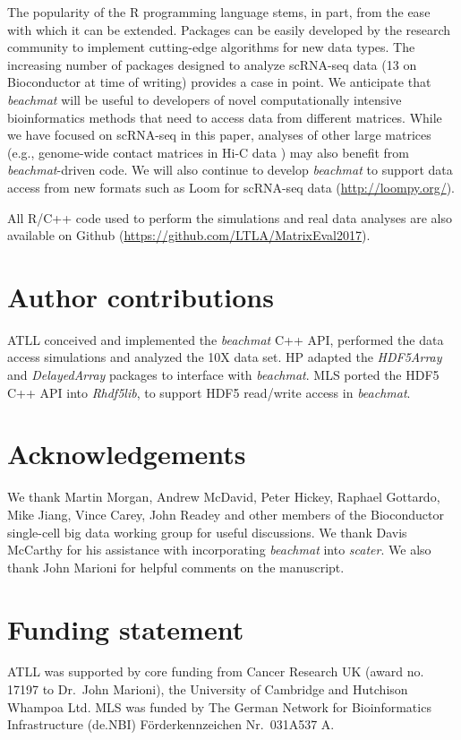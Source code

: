 \documentclass[10pt,letterpaper]{article}
\newcommand{\beachmat}{\textit{beachmat}}
\begin{document}
The popularity of the R programming language stems, in part, from the ease with which it can be extended.
Packages can be easily developed by the research community to implement cutting-edge algorithms for new data types.
The increasing number of packages designed to analyze scRNA-seq data (13 on Bioconductor at time of writing) provides a case in point.
We anticipate that \beachmat{} will be useful to developers of novel computationally intensive bioinformatics methods that need to access data from different matrices.
While we have focused on scRNA-seq in this paper, analyses of other large matrices (e.g., genome-wide contact matrices in Hi-C data \cite{lun2016infrastructure}) may also benefit from \beachmat{}-driven code.
We will also continue to develop \beachmat{} to support data access from new formats such as Loom for scRNA-seq data (\url{http://loompy.org/}).

All R/C++ code used to perform the simulations and real data analyses are also available on Github (\url{https://github.com/LTLA/MatrixEval2017}).

\section*{Author contributions}
ATLL conceived and implemented the \beachmat{} C++ API, performed the data access simulations and analyzed the 10X data set.
HP adapted the \textit{HDF5Array} and \textit{DelayedArray} packages to interface with \beachmat{}.
MLS ported the HDF5 C++ API into \textit{Rhdf5lib}, to support HDF5 read/write access in \beachmat{}.

\section*{Acknowledgements}
We thank Martin Morgan, Andrew McDavid, Peter Hickey, Raphael Gottardo, Mike Jiang, Vince Carey, John Readey and other members of the Bioconductor single-cell big data working group for useful discussions.
We thank Davis McCarthy for his assistance with incorporating \beachmat{} into \textit{scater}.
We also thank John Marioni for helpful comments on the manuscript.

\section*{Funding statement}
ATLL was supported by core funding from Cancer Research UK (award no. 17197 to Dr.\ John Marioni), the University of Cambridge and Hutchison Whampoa Ltd.
MLS was funded by The German Network for Bioinformatics Infrastructure (de.NBI) F\"orderkennzeichen Nr.\ 031A537 A.


\end{document}
